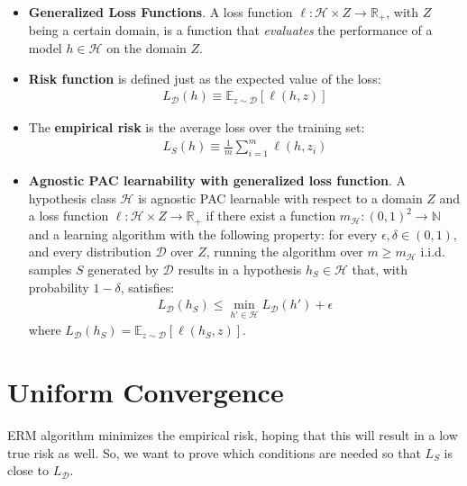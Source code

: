 \documentclass[../template.tex]{subfiles}
\begin{document}
\begin{itemize}
    \item \textbf{Generalized Loss Functions}. A loss function $\ell \colon \mathcal{H}\times Z \to \mathbb{R}_+$, with $Z$ being a certain domain, is a function that \textit{evaluates} the performance of a model $h \in \mathcal{H}$ on the domain $Z$.
    \item \textbf{Risk function} is defined just as the expected value of the loss:
    \begin{align*}
        L_{\mathcal{D}}(h) \equiv \mathbb{E}_{z \sim \mathcal{D}}[\ell(h,z)]
    \end{align*}
    \item The \textbf{empirical risk} is the average loss over the training set:
    \begin{align*}
        L_S(h) \equiv \frac{1}{m} \sum_{i=1}^m \ell(h, z_i) 
    \end{align*} 
    \item \textbf{Agnostic PAC learnability with generalized loss function}. A hypothesis class $\mathcal{H}$ is agnostic PAC learnable with respect to a domain $Z$ and a loss function $\ell\colon \mathcal{H}\times Z \to \mathbb{R}_+$ if there exist a function $m_{\mathcal{H}}\colon (0,1)^2 \to \mathbb{N}$ and a learning algorithm with the following property: for every $\epsilon,\delta \in (0,1)$, and every distribution $\mathcal{D}$ over $Z$, running the algorithm over $m \geq m_{\mathcal{H}}$ i.i.d. samples $S$ generated by $\mathcal{D}$ results in a hypothesis $h_S \in \mathcal{H}$ that, with probability $1-\delta$, satisfies:
    \begin{align*}
        L_{\mathcal{D}}(h_S) \leq \min_{h' \in \mathcal{H}} L_{\mathcal{D}}(h') + \epsilon
    \end{align*}
    where $L_{\mathcal{D}}(h_S) = \mathbb{E}_{z \sim \mathcal{D}}[\ell(h_S,z)]$.
\end{itemize}

\section{Uniform Convergence}
ERM algorithm minimizes the empirical risk, hoping that this will result in a low true risk as well. So, we want to prove which conditions are needed so that $L_S$ is close to $L_{\mathcal{D}}$.
\end{document}
